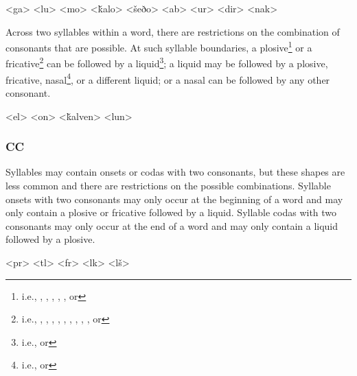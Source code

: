	\a<ga>    
	\a<lu>    
	\a<mo>    
	\a<ǩalo>    
	\a<šeðo>     
	\a<ab>    
	\a<ur>    
	\a<dir>    
	\a<nak>    
\xe

Across two syllables within a word, there are restrictions on the combination of consonants that are possible. At such syllable boundaries, a plosive\footnote{\label{ftn:tvk-plosives}i.e., , , , , , or } or a fricative\footnote{\label{ftn:tvk-fricatives}i.e., , , , , , , , , , or } can be followed by a liquid\footnote{\label{ftn:tvk-liquids}i.e.,  or }; a liquid may be followed by a plosive, fricative, nasal\footnote{\label{ftn:tvk-nasals}i.e.,  or }, or a different liquid; or a nasal can be followed by any other consonant.

	\a<el>    
	\a<on>    
	\a<ǩalven>    
	\a<lun>    
\xe

\subsubsection{CC}

Syllables may contain onsets or codas with two consonants, but these shapes are less common and there are restrictions on the possible combinations. Syllable onsets with two consonants may only occur at the beginning of a word and may only contain a plosive or fricative followed by a liquid. Syllable codas with two consonants may only occur at the end of a word and may only contain a liquid followed by a plosive.

	\a<pr>    
	\a<tl>    
	\a<fr>    
	\a<lk>    
	\a<lš>    
\xe

